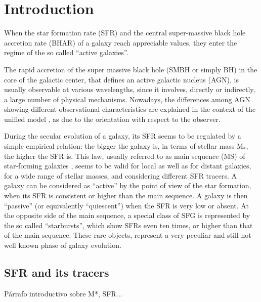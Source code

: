 \chapter{Introduction}



When the star formation rate (SFR) and the central super-massive black hole accretion rate (BHAR) of a galaxy reach appreciable values, they enter the regime of the so called ``active galaxies''.

The rapid accretion of the super massive black hole (SMBH or simply BH) in the core of the galactic center, that defines an active galactic nucleus (AGN), is usually observable at various wavelengths, since it involves, directly or indirectly, a large number of physical mechanisms. Nowadays, the differences among AGN showing different observational characteristics are explained in the context of the unified model \citep{1977ApJ...213..635R, 1984ApJ...278..499A, 1985ApJ...297..621A, 1993ARA&A..31..473A, 1995PASP..107..803U, 2015ARA&A..53..365N}, as due to the orientation with respect to the observer.

During the secular evolution of a galaxy, its SFR seems to be regulated by a simple empirical relation: the bigger the galaxy is, in terms of stellar mass M$_*$, the higher the SFR is. This law, usually referred to as main sequence (MS) of star-forming galaxies \citep{2004MNRAS.351.1151B, 2007A&A...468...33E, 2007ApJ...670..156D, 2007ApJ...660L..47N, 2014MNRAS.443...19R, 2017MNRAS.465.3390A}, seems to be valid for local as well as for distant galaxies, for a wide range of stellar masses, and considering different SFR tracers. A galaxy can be considered as ``active'' by the point of view of the star formation, when its SFR is consistent or higher than the main sequence. A galaxy is then ``passive'' (or equivalently ``quiescent'') when the SFR is very low or absent. At the opposite side of the main sequence, a special class of SFG is represented by the so called ``starbursts'', which show SFRs even ten times, or higher than that of the main sequence. These rare objects, represent a very peculiar and still not well known phase of galaxy evolution. 

\section{SFR and its tracers}%
Párrafo introductivo sobre M*, SFR...

